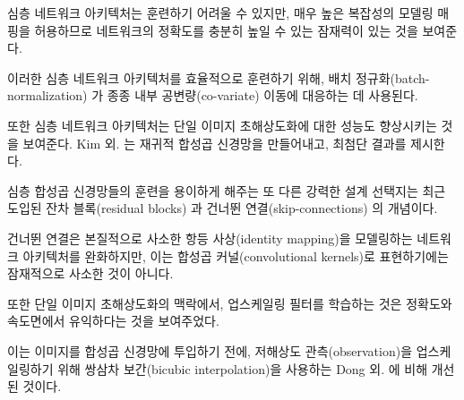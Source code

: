 \documentclass[10pt,twocolumn,letterpaper]{article}
\newcommand{\kor}[1]{#1}
\newcommand{\eng}[1]{}
\begin{document}
\eng{
It was shown that deeper network architectures can be difficult to train but have the potential to substantially increase the network's accuracy as they allow modeling mappings of very high complexity \cite{simonyan2014very,szegedy2015going}.
}\kor{
심층 네트워크 아키텍처는 훈련하기 어려울 수 있지만, 매우 높은 복잡성의 모델링 매핑을 허용하므로 네트워크의 정확도를 충분히 높일 수 있는 잠재력이 있는 것을 보여준다.
} \eng{
To efficiently train these deeper network architectures, batch-normalization \cite{Ioffe2015} is often used to counteract the internal co-variate shift.
}\kor{
이러한 심층 네트워크 아키텍처를 효율적으로 훈련하기 위해, 배치 정규화(batch-normalization) \cite{Ioffe2015}가 종종 내부 공변량(co-variate) 이동에 대응하는 데 사용된다.
} \eng{
Deeper network architectures have also been shown to increase performance for \ac{SISR}, \eg Kim et al. \cite{kim2016deeply} formulate a recursive \ac{CNN} and present state-of-the-art results.
}\kor{
또한 심층 네트워크 아키텍처는 \ac{단일 이미지 초해상도화}에 대한 성능도 향상시키는 것을 보여준다. \eg Kim 외.  \cite{kim2016deeply}는 재귀적 \ac{합성곱 신경망}을 만들어내고, 최첨단 결과를 제시한다.
}
\eng{
Another powerful design choice that eases the training of deep \ac{CNN}s is the recently introduced concept of residual blocks \cite{he2015deep} and skip-connections \cite{he2016identity,kim2016deeply}.
}\kor{
심층 \ac{합성곱 신경망}들의 훈련을 용이하게 해주는 또 다른 강력한 설계 선택지는 최근 도입된 잔차 블록(residual blocks) \cite{he2015deep}과 건너뛴 연결(skip-connections) \cite{he2016identity,kim2016deeply}의 개념이다.
} \eng{
Skip-connections relieve the network architecture of modeling the identity mapping that is trivial in nature, however, potentially non-trivial to represent with convolutional kernels.
}\kor{
건너뛴 연결은 본질적으로 사소한 항등 사상(identity mapping)을 모델링하는 네트워크 아키텍처를 완화하지만, 이는 합성곱 커널(convolutional kernels)로 표현하기에는 잠재적으로 사소한 것이 아니다.
}

\eng{
In the context of \ac{SISR} it was also shown that learning upscaling filters is beneficial in terms of accuracy and speed \cite{dong2016accelerating,Shi2016ESPCN,Wang2016}.
}\kor{
또한 \ac{단일 이미지 초해상도화}의 맥락에서, 업스케일링 필터를 학습하는 것은 정확도와 속도면에서 유익하다는 것을 보여주었다\cite{dong2016accelerating,Shi2016ESPCN,Wang2016}.
}
\eng{
This is an improvement over Dong et al. \cite{dong2016image} where bicubic interpolation is employed to upscale the LR observation before feeding the image to the \ac{CNN}.
}\kor{
이는 이미지를 \ac{합성곱 신경망}에 투입하기 전에, \ac{저해상도} 관측(observation)을 업스케일링하기 위해 쌍삼차 보간(bicubic interpolation)을 사용하는 Dong 외. \cite{dong2016image}에 비해 개선된 것이다.
} %
\end{document}
